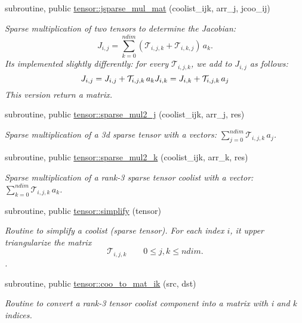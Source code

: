 \begin{DoxyCompactItemize}
subroutine, public \hyperlink{namespacetensor_a4135cf70df5030070922ff199c79cc03}{tensor\+::jsparse\+\_\+mul\+\_\+mat} (coolist\+\_\+ijk, arr\+\_\+j, jcoo\+\_\+ij)
\begin{DoxyCompactList}\small\item\em Sparse multiplication of two tensors to determine the Jacobian\+: \[J_{i,j} = {\displaystyle \sum_{k=0}^{ndim}} \left( \mathcal{T}_{i,j,k} + \mathcal{T}_{i,k,j} \right) \, a_k.\] It\textquotesingle{}s implemented slightly differently\+: for every $\mathcal{T}_{i,j,k}$, we add to $J_{i,j}$ as follows\+: \[J_{i,j} = J_{i,j} + \mathcal{T}_{i,j,k} \, a_k \\ J_{i,k} = J_{i,k} + \mathcal{T}_{i,j,k} \, a_j\] This version return a matrix. \end{DoxyCompactList}\item 
subroutine, public \hyperlink{namespacetensor_ad9b09d91fb1bd425122c4f1ee2f0eb12}{tensor\+::sparse\+\_\+mul2\+\_\+j} (coolist\+\_\+ijk, arr\+\_\+j, res)
\begin{DoxyCompactList}\small\item\em Sparse multiplication of a 3d sparse tensor with a vectors\+: ${\displaystyle \sum_{j=0}^{ndim}} \mathcal{T}_{i,j,k} \, a_j $. \end{DoxyCompactList}\item 
subroutine, public \hyperlink{namespacetensor_a90e31e5e782d63d7f05ee3c9aed370e0}{tensor\+::sparse\+\_\+mul2\+\_\+k} (coolist\+\_\+ijk, arr\+\_\+k, res)
\begin{DoxyCompactList}\small\item\em Sparse multiplication of a rank-\/3 sparse tensor coolist with a vector\+: ${\displaystyle \sum_{k=0}^{ndim}} \mathcal{T}_{i,j,k} \, a_k $. \end{DoxyCompactList}\item 
subroutine, public \hyperlink{namespacetensor_a364522b80ab0f4785c331eb74fa1ba04}{tensor\+::simplify} (tensor)
\begin{DoxyCompactList}\small\item\em Routine to simplify a coolist (sparse tensor). For each index $i$, it upper triangularize the matrix \[\mathcal{T}_{i,j,k} \qquad 0 \leq j,k \leq ndim.\]. \end{DoxyCompactList}\item 
subroutine, public \hyperlink{namespacetensor_a52784eb2977ec36f8ab5ba240b497633}{tensor\+::coo\+\_\+to\+\_\+mat\+\_\+ik} (src, dst)
\begin{DoxyCompactList}\small\item\em Routine to convert a rank-\/3 tensor coolist component into a matrix with i and k indices. \end{DoxyCompactList}\item 

\end{DoxyCompactItemize}
